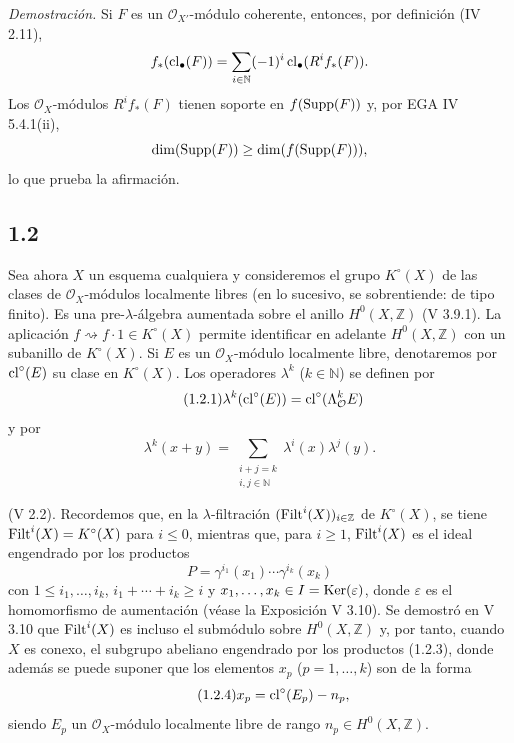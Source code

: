\emph{Demostración.}
Si $F$ es un $\mathcal O_{X'}$-módulo coherente, entonces, por definición
(IV 2.11),
\[
f_*(\operatorname{cl}_\bullet(F))=
\sum_{i\in\mathbb N}(-1)^i\operatorname{cl}_\bullet(R^if_*(F)).
\]
Los $\mathcal O_X$-módulos $R^if_*(F)$ tienen soporte en $f(\operatorname{Supp}(F))$ y, por
EGA IV 5.4.1(ii),
\[
\dim(\operatorname{Supp}(F))\geq\dim(f(\operatorname{Supp}(F))),
\]
lo que prueba la afirmación.

\subsection*{1.2}
Sea ahora $X$ un esquema cualquiera y consideremos el grupo $K^\circ(X)$ de
las clases de $\mathcal O_X$-módulos localmente libres (en lo sucesivo, se
sobrentiende: de tipo finito). Es una pre-$\lambda$-álgebra aumentada sobre el
anillo $H^0(X,\mathbb Z)$ (V 3.9.1). La aplicación
$f\rightsquigarrow f\cdot1\in K^\circ(X)$ permite identificar en adelante
$H^0(X,\mathbb Z)$ con un subanillo de $K^\circ(X)$. Si $E$ es un
$\mathcal O_X$-módulo localmente libre, denotaremos por $\operatorname{cl}^\circ(E)$ su clase
en $K^\circ(X)$. Los operadores $\lambda^k$ ($k\in\mathbb N$) se definen por
\begin{equation}\tag{1.2.1}
\lambda^k(\operatorname{cl}^\circ(E))=\operatorname{cl}^\circ(\Lambda_{\mathcal O}^kE)
\end{equation}
y por
\begin{equation}\tag{1.2.2}
\lambda^k(x+y)=
\sum_{\substack{i+j=k\\ i,j\in\mathbb N}}\lambda^i(x)\lambda^j(y).
\end{equation}

(V 2.2). Recordemos que, en la $\lambda$-filtración
$(\operatorname{Filt}^i(X))_{i\in\mathbb Z}$ de $K^\circ(X)$, se tiene
$\operatorname{Filt}^i(X)=K^\circ(X)$ para $i\leq0$, mientras que, para $i\geq1$,
$\operatorname{Filt}^i(X)$ es el ideal engendrado por los productos
\begin{equation}\tag{1.2.3}
P=\gamma^{i_1}(x_1)\cdots\gamma^{i_k}(x_k)
\end{equation}
con $1\leq i_1,\ldots,i_k$, $i_1+\cdots+i_k\geq i$ y
$x_1,\ldots,x_k\in I=\operatorname{Ker}(\varepsilon)$, donde $\varepsilon$ es el
homomorfismo de aumentación (véase la Exposición V 3.10). Se demostró en
V 3.10 que $\operatorname{Filt}^i(X)$ es incluso el submódulo sobre $H^0(X,\mathbb Z)$ y,
por tanto, cuando $X$ es conexo, el subgrupo abeliano engendrado por los
productos (1.2.3), donde además se puede suponer que los elementos $x_p$
($p=1,\ldots,k$) son de la forma
\begin{equation}\tag{1.2.4}
x_p=\operatorname{cl}^\circ(E_p)-n_p,
\end{equation}
siendo $E_p$ un $\mathcal O_X$-módulo localmente libre de rango
$n_p\in H^0(X,\mathbb Z)$.

